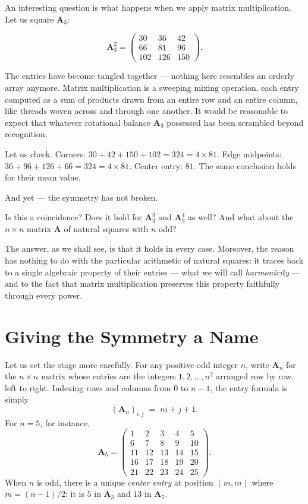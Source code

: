 \documentclass[a4paper,11pt]{article}
\theoremstyle{plain}
\theoremstyle{definition}
\theoremstyle{remark}
\newcommand{\A}{\mathbf{A}}
\begin{document}
An interesting question is what happens when we apply matrix
multiplication. Let us square $\A_3$:

\[
  \A_3^2 =
  \begin{pmatrix}
    30 & 36 & 42\\
    66 & 81 & 96\\
    102 & 126 & 150
  \end{pmatrix}.
\]

The entries have become tangled together --- nothing here resembles an
orderly array anymore.
Matrix multiplication is a sweeping mixing operation, each entry
computed as a sum of products drawn from an entire row and an entire
column, like threads woven across and through one another.
It would be reasonable to expect that whatever rotational balance
$\A_3$ possessed has been scrambled beyond recognition.

Let us check. Corners: $30+42+150+102 = 324 = 4\times81$.
Edge midpoints: $36+96+126+66 = 324 = 4\times81$.
Center entry: $81$. The same conclusion holds for their mean value.

And yet --- the symmetry has not broken.

Is this a coincidence? Does it hold for $\A_3^3$ and $\A_3^4$ as well?
And what about the $n\times n$ matrix $\A$ of natural squares with $n$ odd?

The answer, as we shall see, is that it holds in every case.
Moreover, the reason has nothing to do with the particular arithmetic
of natural squares: it traces back to a single algebraic property of
their entries --- what we will call \emph{harmonicity} --- and to the
fact that matrix multiplication preserves this property faithfully
through every power.


\section{Giving the Symmetry a Name}

Let us set the stage more carefully.
For any positive odd integer $n$, write $\A_n$ for the $n\times n$ matrix
whose entries are the integers $1, 2, \dots, n^2$ arranged row by row,
left to right. Indexing rows and columns from $0$ to $n-1$, the entry
formula is simply
\[
  (\A_n)_{i,j} \;=\; ni+j+1.
\]
For $n=5$, for instance,
\[
  \A_5 =
  \begin{pmatrix}
    1 & 2 & 3 & 4 & 5\\
    6 & 7 & 8 & 9 &10\\
   11 &12 &13 &14 &15\\
   16 &17 &18 &19 &20\\
   21 &22 &23 &24 &25
  \end{pmatrix}.
\]
When $n$ is odd, there is a unique \emph{center entry} at position
$(m,m)$ where $m=(n-1)/2$: it is $5$ in $\A_3$ and $13$ in $\A_5$.
\end{document}
